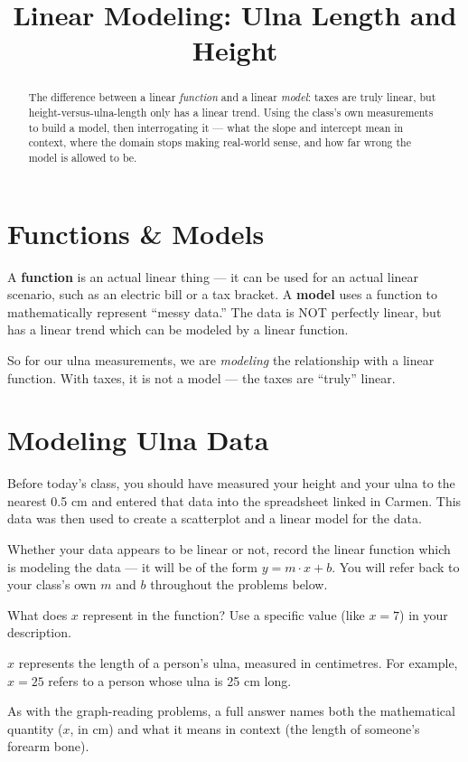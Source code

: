 \documentclass[12pt]{ximera}
\title{Linear Modeling: Ulna Length and Height}
\begin{document}
\begin{abstract}
The difference between a linear \emph{function} and a linear \emph{model}: taxes are
truly linear, but height-versus-ulna-length only has a linear trend. Using the class's
own measurements to build a model, then interrogating it --- what the slope and
intercept mean in context, where the domain stops making real-world sense, and how far
wrong the model is allowed to be.
\end{abstract}
\maketitle

\section*{Functions \& Models}

A \textbf{function} is an actual linear thing --- it can be used for an actual linear
scenario, such as an electric bill or a tax bracket. A \textbf{model} uses a function
to mathematically represent ``messy data.'' The data is NOT perfectly linear, but has a
linear trend which can be modeled by a linear function.

So for our ulna measurements, we are \emph{modeling} the relationship with a linear
function. With taxes, it is not a model --- the taxes are ``truly'' linear.

\section*{Modeling Ulna Data}

Before today's class, you should have measured your height and your ulna to the nearest
0.5 cm and entered that data into the spreadsheet linked in Carmen. This data was then
used to create a scatterplot and a linear model for the data.

Whether your data appears to be linear or not, record the linear function which is
modeling the data --- it will be of the form $y = m \cdot x + b$. You will refer back to
your class's own $m$ and $b$ throughout the problems below.

\begin{problem}
What does $x$ represent in the function? Use a specific value (like $x = 7$) in your
description.

\begin{freeResponse}
\end{freeResponse}

\begin{solution}
$x$ represents the length of a person's ulna, measured in centimetres. For example,
$x = 25$ refers to a person whose ulna is 25 cm long.

As with the graph-reading problems, a full answer names both the mathematical quantity
($x$, in cm) and what it means in context (the length of someone's forearm bone).
\end{solution}
\end{problem}
\end{document}
